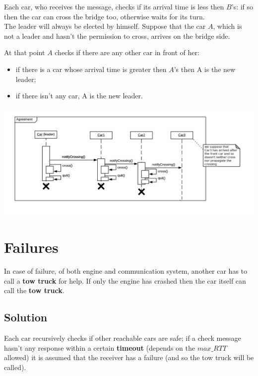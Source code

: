 Each car, who receives the message, checks if its arrival time is less then $B$'s: 
if so then the car can cross the bridge too, otherwise waits for its turn.\\

\noindent
The leader will always be elected by himself. Suppose that the car $A$, 
which is not a leader and hasn't the permission to cross, arrives on the bridge side.

At that point $A$ checks if there are any other car in front of her:
\begin{itemize}
\item if there is a car whose arrival time is greater then $A$'s then A 
    is the new leader;
\item if there isn't any car, A is the new leader.
\end{itemize}

\begin{center}
    \includegraphics[scale=0.6]{assets/ds2019_3.png}
\end{center}


\section{Failures}

In case of failure, of both engine and communication system,
another car has to call a \textbf{tow truck} for help. 
If only the engine has crashed then the car
itself can call the \textbf{tow truck}.


\subsection{Solution}

Each car recursively checks if other reachable cars are safe; if a check message
hasn't any response within a certain \textbf{timeout} (depends on the $max\_RTT$ allowed) 
it is assumed that the receiver has a failure (and so the tow truck will be called). 

